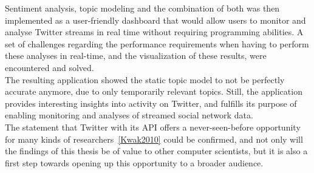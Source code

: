 Sentiment analysis, topic modeling and the combination of both was then implemented as a user-friendly dashboard that would
allow users to monitor and analyse Twitter streams in real time without requiring programming abilities.
A set of challenges regarding the performance requirements when having to perform these analyses in real-time,
and the visualization of these results, were encountered and solved.
\\
The resulting application showed the static topic model to not be perfectly accurate anymore,
due to only temporarily relevant topics.
Still, the application provides interesting insights into activity on Twitter,
and fulfills its purpose of enabling monitoring and analyses of streamed social network data.
\\
The statement that Twitter with its API offers a never-seen-before opportunity for
many kinds of researchers~\ref{Kwak2010} could be confirmed,
and not only will the findings of this thesis be of value to other computer scientists,
but it is also a first step towards opening up this opportunity to a broader audience.
